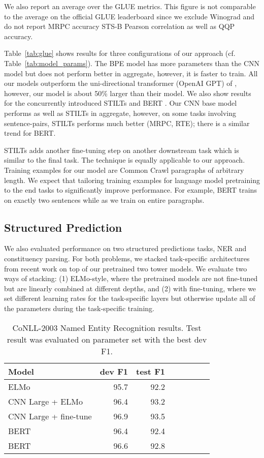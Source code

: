 \documentclass[11pt,a4paper]{article}
\begin{document}
We also report an average over the GLUE metrics. This figure is not comparable to the average on the official GLUE leaderboard since we exclude Winograd and do not report MRPC accuracy STS-B Pearson correlation as well as QQP accuracy.



Table~\ref{tab:glue} shows results for three configurations of our approach (cf. Table~\ref{tab:model_params}). 
The BPE model has more parameters than the CNN model but does not perform better in aggregate, however, it is faster to train.
All our models outperform the uni-directional transformer (OpenAI GPT) of \citet{radford2018unsup}, however, our model is about 50\% larger than their model.
We also show results for the concurrently introduced STILTs \citep{phang2018stilts} and BERT \citep{devlin2018bert}.
Our CNN base model performs as well as STILTs in aggregate, however, on some tasks involving sentence-pairs, STILTs performs much better (MRPC, RTE); there is a similar trend for BERT.

STILTs adds another fine-tuning step on another downstream task which is similar to the final task.
The technique is equally applicable to our approach.
Training examples for our model are  Common Crawl paragraphs of arbitrary length.
We expect that tailoring training examples for language model pretraining to the end tasks to significantly improve performance. 
For example, BERT trains on exactly two sentences while as we train on entire paragraphs.


\subsection{Structured Prediction}

We also evaluated performance on two structured predictions tasks, NER and constituency parsing. For both problems, we stacked task-specific architectures from recent work on top of our pretrained two tower models. We evaluate two ways of stacking: (1) ELMo-style, where the pretrained models are not fine-tuned but are linearly combined at different depths, and (2) with fine-tuning, where we set different learning rates for the task-specific layers but otherwise update all of the parameters during the task-specific training. 


\begin{table}[t]
\centering
\begin{tabular}{lrrrrrcr}
\toprule
\bf Model & \bf dev F1 & \bf test F1 \\ \midrule
ELMo &  95.7 & 92.2  \\ \midrule
CNN Large + ELMo & 96.4 & 93.2\\ 
CNN Large + fine-tune & 96.9 &93.5 \\ \midrule
BERT & 96.4 & 92.4  \\
BERT & 96.6 & 92.8 \\
\bottomrule
\end{tabular}
\caption{ CoNLL-2003 Named Entity Recognition results. Test result was evaluated on parameter set with the best dev F1.}
\label{tab:NER_results}
\end{table}
\end{document}

